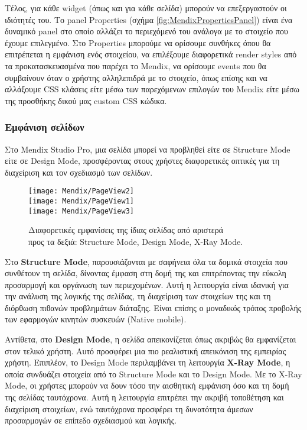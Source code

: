                 Τέλος, για κάθε widget (όπως και για κάθε σελίδα) μπορούν να επεξεργαστούν οι ιδιότητές του. Το panel Properties (σχήμα \ref{fig:MendixPropertiesPanel}) είναι ένα δυναμικό panel στο οποίο αλλάζει το περιεχόμενό του ανάλογα με το στοιχείο που έχουμε επιλεγμένο. Στο Properties μπορούμε να ορίσουμε συνθήκες όπου θα επιτρέπεται η εμφάνιση ενός στοιχείου, να επιλέξουμε διαφορετικά render styles από τα προκατασκευασμένα που παρέχει το Mendix, να ορίσουμε events που θα συμβαίνουν όταν ο χρήστης αλληλεπιδρά με το στοιχείο, όπως επίσης και να αλλάξουμε CSS κλάσεις είτε μέσω των παρεχόμενων επιλογών του Mendix είτε μέσω της προσθήκης δικού μας custom CSS κώδικα.

        \subsubsection{Εμφάνιση σελίδων} \label{sec:MendixPageView}
            Στο Mendix Studio Pro, μια σελίδα μπορεί να προβληθεί είτε σε Structure Mode είτε σε Design Mode, προσφέροντας στους χρήστες διαφορετικές οπτικές για τη διαχείριση και τον σχεδιασμό των σελίδων.

            \begin{figure}[h!] \noindent \centering
                \texttt{[image: Mendix/PageView2]} \\
                \texttt{[image: Mendix/PageView1]} \\
                \texttt{[image: Mendix/PageView3]}
                \caption{\centering Διαφορετικές εμφανίσεις της ίδιας σελίδας από αριστερά \\ προς τα δεξιά: Structure Mode, Design Mode, X-Ray Mode.}
            \end{figure}

            Στο \textbf{Structure Mode}, παρουσιάζονται με σαφήνεια όλα τα δομικά στοιχεία που συνθέτουν τη σελίδα, δίνοντας έμφαση στη δομή της και επιτρέποντας την εύκολη προσαρμογή και οργάνωση των περιεχομένων. Αυτή η λειτουργία είναι ιδανική για την ανάλυση της λογικής της σελίδας, τη διαχείριση των στοιχείων της και τη διόρθωση πιθανών προβλημάτων διάταξης. Είναι επίσης ο μοναδικός τρόπος προβολής των εφαρμογών κινητών συσκευών (Native mobile).

            Αντίθετα, στο \textbf{Design Mode}, η σελίδα απεικονίζεται όπως ακριβώς θα εμφανίζεται στον τελικό χρήστη. Αυτό προσφέρει μια πιο ρεαλιστική απεικόνιση της εμπειρίας χρήστη. Επιπλέον, το Design Mode περιλαμβάνει τη λειτουργία \textbf{X-Ray Mode}, η οποία συνδυάζει στοιχεία από το Structure Mode και το Design Mode. Με το X-Ray Mode, οι χρήστες μπορούν να δουν τόσο την αισθητική εμφάνιση όσο και τη δομή της σελίδας ταυτόχρονα. Αυτή η λειτουργία επιτρέπει την ακριβή τοποθέτηση και διαχείριση στοιχείων, ενώ ταυτόχρονα προσφέρει τη δυνατότητα άμεσων προσαρμογών σε επίπεδο σχεδιασμού και λογικής.

